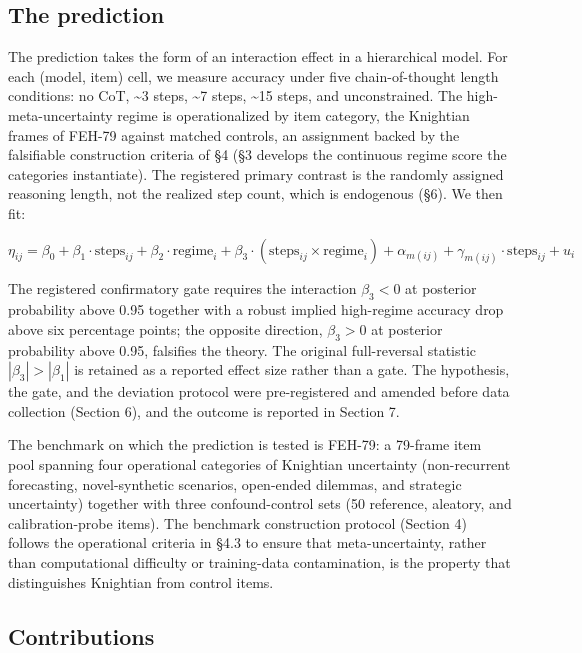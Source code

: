 \documentclass{article}
\begin{document}
\subsection{The prediction}\label{the-prediction}

The prediction takes the form of an interaction effect in a hierarchical
model. For each (model, item) cell, we measure accuracy under five
chain-of-thought length conditions: no CoT, \textasciitilde3 steps,
\textasciitilde7 steps, \textasciitilde15 steps, and unconstrained. The
high-meta-uncertainty regime is operationalized by item category, the
Knightian frames of FEH-79 against matched controls, an assignment
backed by the falsifiable construction criteria of \S{}4 (\S{}3 develops the
continuous regime score the categories instantiate). The registered
primary contrast is the randomly assigned reasoning length, not the
realized step count, which is endogenous (\S{}6). We then fit:

\[\eta_{ij} = \beta_{0} + \beta_{1} \cdot \text{steps}_{ij} + \beta_{2} \cdot \text{regime}_{i} + \beta_{3} \cdot (\text{steps}_{ij} \times \text{regime}_{i}) + \alpha_{m(ij)} + \gamma_{m(ij)} \cdot \text{steps}_{ij} + u_{i}\]

The registered confirmatory gate requires the interaction
\(\beta_{3} < 0\) at posterior probability above 0.95 together with a
robust implied high-regime accuracy drop above six percentage points;
the opposite direction, \(\beta_{3} > 0\) at posterior probability above
0.95, falsifies the theory. The original full-reversal statistic
\(|\beta_{3}| > |\beta_{1}|\) is retained as a reported effect size
rather than a gate. The hypothesis, the gate, and the deviation protocol
were pre-registered and amended before data collection (Section 6), and
the outcome is reported in Section 7.

The benchmark on which the prediction is tested is FEH-79: a 79-frame
item pool spanning four operational categories of Knightian uncertainty
(non-recurrent forecasting, novel-synthetic scenarios, open-ended
dilemmas, and strategic uncertainty) together with three
confound-control sets (50 reference, aleatory, and calibration-probe
items). The benchmark construction protocol (Section 4) follows the
operational criteria in \S{}4.3 to ensure that meta-uncertainty, rather
than computational difficulty or training-data contamination, is the
property that distinguishes Knightian from control items.

\subsection{Contributions}\label{contributions}
\end{document}
